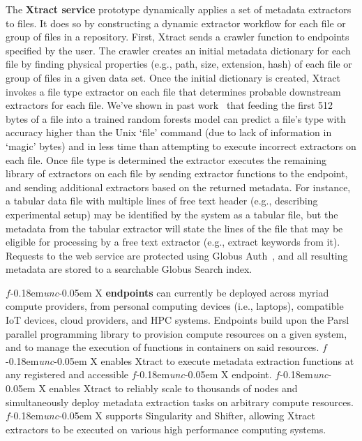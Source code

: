 \documentclass[sigconf, 9pt]{acmart}
\newcommand{\name}{Xtract}
\newcommand{\funcx}{$f$\kern-0.18em\emph{unc}\kern-0.05em X}
\begin{document}
The \textbf{\name{} service} prototype dynamically applies a set of metadata extractors to files. 
It does so by constructing a dynamic extractor workflow for each file 
or group of files in a repository.  
First, \name{} sends a crawler function to endpoints specified by the user.  The crawler creates an 
initial metadata dictionary for each file by finding physical properties (e.g., path, size, extension, hash) of each file or group of files
in a given data set.  Once the initial dictionary is created, \name{} invokes a file type extractor on each file that determines probable downstream extractors for each file. We've shown in past work~\cite{skluzacek2018skluma} that feeding the first 512 bytes of a file into 
a trained random forests model can predict a file's type with accuracy higher than the Unix `file' command (due to lack of information in `magic' bytes) and in less time
than attempting to execute incorrect extractors on each file. Once file type is determined the extractor executes the remaining library of extractors 
on each file by sending extractor functions to the endpoint, and sending additional extractors based on the returned metadata.  For instance, 
a tabular data file with multiple lines of free text header (e.g., describing experimental setup) may be identified by the system as a tabular file, but 
the metadata from the tabular 
extractor will state the lines of the file that may be eligible for processing by a free text extractor (e.g., extract keywords from it).
Requests to the web service are protected using Globus Auth~\cite{tuecke2016globus}, and all resulting metadata are stored to a searchable Globus Search index. 

\funcx{} \textbf{endpoints} can currently be deployed across myriad compute providers, from personal computing devices (i.e., laptops), compatible 
IoT devices, cloud providers, and HPC systems.  Endpoints build upon the Parsl~\cite{babuji2019parsl} parallel programming library to 
provision compute resources on a given system, and to manage the execution of functions in containers on said resources. \funcx{} enables 
\name{} to execute metadata extraction functions at any registered and accessible \funcx{} endpoint.  \funcx{} enables \name{} to reliably 
scale to thousands of nodes and simultaneously deploy metadata extraction tasks on arbitrary compute resources. 
\funcx{} supports Singularity and Shifter, allowing \name{} extractors to be executed
on various high performance computing systems. 
\end{document}
